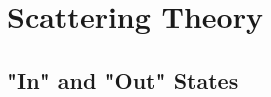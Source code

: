 \section{Scattering Theory}\label{sec:chapter3}

\subsection{"In" and "Out" States}\label{susec:3_1}